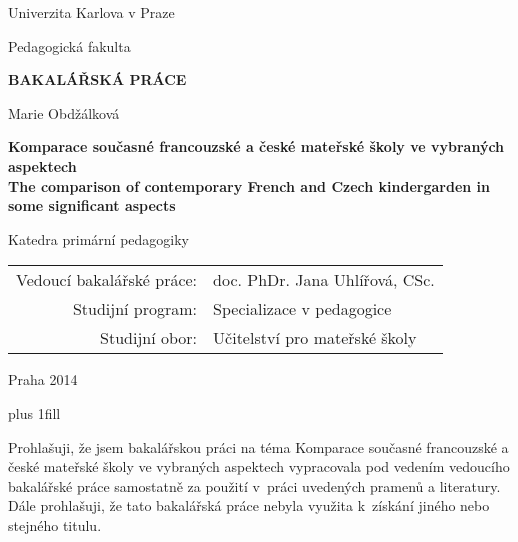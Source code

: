 \documentclass[12pt,a4paper,singleside,openright]{report}
\newcommand{\mujNazevPrace}{Komparace současné francouzské a české mateřské školy ve vybraných aspektech}
\newcommand{\mujNazevPraceAJ}{The comparison of contemporary French and Czech kindergarden in some significant aspects}
\newcommand{\mujVedouci}{doc. PhDr. Jana Uhlířová, CSc.}
\newcommand{\mujKatedra}{Katedra primární pedagogiky}
\newcommand{\mujProgram}{Specializace v pedagogice}
\newcommand{\mujObor}{Učitelství pro mateřské školy}
\begin{document}


\pagestyle{empty}
\begin{center}

\large

Univerzita Karlova v Praze

\medskip

Pedagogická fakulta

\vfill

{\bf\Large BAKALÁŘSKÁ PRÁCE}

\vfill


\vfill
\vspace{5mm}

{\LARGE Marie Obdžálková}

\vspace{15mm}

{\LARGE\bfseries
	\mujNazevPrace
\large\bfseries \\
\vspace{8mm}
	\mujNazevPraceAJ
}

\vfill

\mujKatedra

\vfill

\begin{tabular}{rl}

Vedoucí bakalářské práce: & \mujVedouci \\
\noalign{\vspace{2mm}}
Studijní program: & \mujProgram \\
\noalign{\vspace{2mm}}
Studijní obor: & \mujObor \\
\end{tabular}

\vfill

Praha 2014

\end{center}

\newpage

	\vglue 0pt plus 1fill

	\noindent
	Prohlašuji, že jsem bakalářskou práci na téma Komparace současné francouzské a české mateřské školy ve vybraných aspektech vypracovala pod vedením vedoucího bakalářské práce samostatně za použití v práci uvedených pramenů a literatury. Dále prohlašuji, že tato bakalářská práce nebyla využita k získání jiného nebo stejného titulu.
\end{document}
